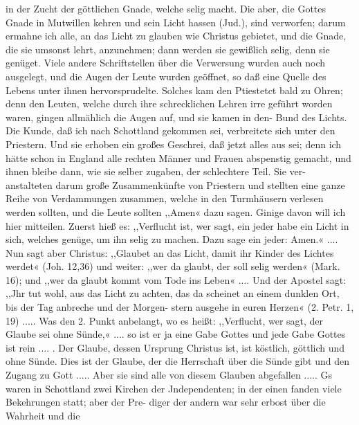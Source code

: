 in der Zucht der göttlichen Gnade, welche selig macht. Die aber,
die Gottes Gnade in Mutwillen kehren und sein Licht hassen
(Jud.), sind verworfen; darum ermahne ich alle, an das Licht zu
glauben wie Christus gebietet, und die Gnade, die sie umsonst
lehrt, anzunehmen; dann werden sie gewißlich selig, denn sie
genüget. Viele andere Schriftstellen über die Verwersung wurden
auch noch ausgelegt, und die Augen der Leute wurden geöffnet,
so daß eine Quelle des Lebens unter ihnen hervorsprudelte.
Solches kam den Ptiestetct bald zu Ohren; denn den Leuten,
welche durch ihre schrecklichen Lehren irre geführt worden waren,
gingen allmählich die Augen auf, und sie kamen in den- Bund
des Lichts. Die Kunde, daß ich nach Schottland gekommen sei,
verbreitete sich unter den Priestern. Und sie erhoben ein großes
Geschrei, daß jetzt alles aus sei; denn ich hätte schon in England
alle rechten Männer und Frauen abspenstig gemacht, und ihnen
bleibe dann, wie sie selber zugaben, der schlechtere Teil. Sie ver-
anstalteten darum große Zusammenkünfte von Priestern und
stellten eine ganze Reihe von Verdammungen zusammen, welche
in den Turmhäusern verlesen werden sollten, und die Leute sollten
,,Amen« dazu sagen. Ginige davon will ich hier mitteilen. Zuerst
hieß es: ,,Verflucht ist, wer sagt, ein jeder habe ein Licht in sich,
welches genüge, um ihn selig zu machen. Dazu sage ein jeder:
Amen.« .... Nun sagt aber Christus: ,,Glaubet an das Licht,
damit ihr Kinder des Lichtes werdet« (Joh. 12,36) und weiter:
,,wer da glaubt, der soll selig werden« (Mark. 16); und ,,wer
da glaubt kommt vom Tode ins Leben« .... Und der Apostel
sagt: ,,Jhr tut wohl, aus das Licht zu achten, das da scheinet
an einem dunklen Ort, bis der Tag anbreche und der Morgen-
stern ausgehe in euren Herzen« (2. Petr. 1, 19) ..... Was
den 2. Punkt anbelangt, wo es heißt: ,,Verflucht, wer sagt, der
Glaube sei ohne Sünde,« .... so ist er ja eine Gabe Gottes
und jede Gabe Gottes ist rein .... . Der Glaube, dessen
Ursprung Christus ist, ist köstlich, göttlich und ohne Sünde. Dies
ist der Glaube, der die Herrschaft über die Sünde gibt und den
Zugang zu Gott ..... Aber sie sind alle von diesem Glauben
abgefallen .....
Gs waren in Schottland zwei Kirchen der Jndependenten;
in der einen fanden viele Bekehrungen statt; aber der Pre-
diger der andern war sehr erbost über die Wahrheit und die


